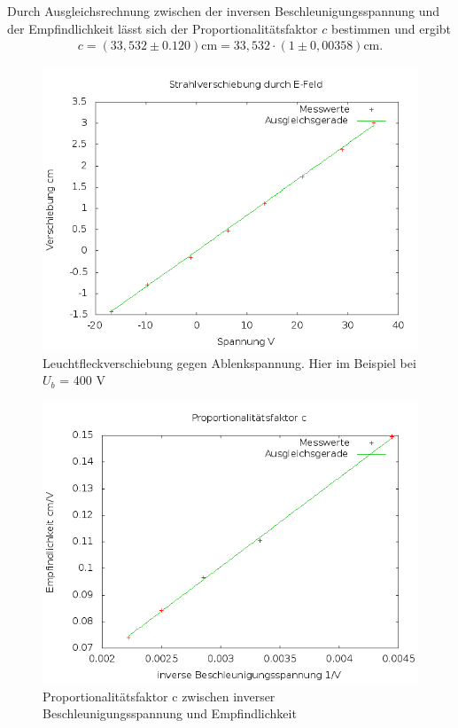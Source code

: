 Durch Ausgleichsrechnung zwischen der inversen Beschleunigungsspannung und der Empfindlichkeit lässt sich der 
Proportionalitätsfaktor $c$ bestimmen und ergibt 
\begin{align}
 c = (33,532 \pm 0.120) \text{cm} = 33,532 \cdot (1 \pm 0,00358) \text{cm}
 \label{c}.
\end{align}

\begin{figure}[htbp]
\includegraphics[width=1\textwidth] {pics/400.png}
\centering
\caption{Leuchtfleckverschiebung gegen Ablenkspannung. Hier im Beispiel bei $U_b$ = 400 V}
\end{figure}

\begin{figure}[htb]
\includegraphics[width=1\textwidth] {pics/proportional.png}
\centering
\caption{Proportionalitätsfaktor c zwischen inverser Beschleunigungsspannung und Empfindlichkeit}
\end{figure}


